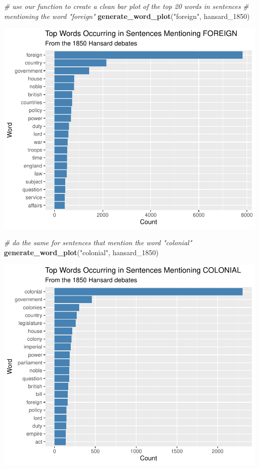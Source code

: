 \documentclass[
]{article}
\newenvironment{Shaded}{\begin{snugshade}}{\end{snugshade}}
\newcommand{\CommentTok}[1]{\textcolor[rgb]{0.56,0.35,0.01}{\textit{#1}}}
\newcommand{\FunctionTok}[1]{\textcolor[rgb]{0.13,0.29,0.53}{\textbf{#1}}}
\newcommand{\NormalTok}[1]{#1}
\newcommand{\StringTok}[1]{\textcolor[rgb]{0.31,0.60,0.02}{#1}}
\begin{document}
\begin{Shaded}
\begin{Highlighting}[]
\CommentTok{\# use our function to create a clean bar plot of the top 20 words in sentences }
\CommentTok{\# mentioning the word "foreign"}
\FunctionTok{generate\_word\_plot}\NormalTok{(}\StringTok{"foreign"}\NormalTok{, hansard\_1850)}
\end{Highlighting}
\end{Shaded}

\includegraphics[width=0.8\linewidth]{ch1-11.25.2024_files/figure-latex/unnamed-chunk-39-1}

\begin{Shaded}
\begin{Highlighting}[]
\CommentTok{\# do the same for sentences that mention the word "colonial"}
\FunctionTok{generate\_word\_plot}\NormalTok{(}\StringTok{"colonial"}\NormalTok{, hansard\_1850)}
\end{Highlighting}
\end{Shaded}

\includegraphics[width=0.8\linewidth]{ch1-11.25.2024_files/figure-latex/unnamed-chunk-40-1}
\end{document}
